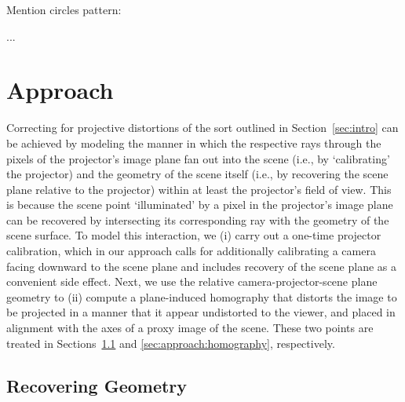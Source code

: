 \documentclass[review]{elsarticle}
\begin{document}
Mention circles pattern: \cite{chiu2011novel}

...


\section{Approach}

Correcting for projective distortions of the sort outlined in Section~\ref{sec:intro} can be achieved by modeling the manner in which the respective rays through the pixels of the projector's image plane fan out into the scene (i.e., by `calibrating' the projector) and the geometry of the scene itself (i.e., by recovering the scene plane relative to the projector) within at least the projector's field of view. This is because the scene point `illuminated' by a pixel in the projector's image plane can be recovered by intersecting its corresponding ray with the geometry of the scene surface. To model this interaction, we (i) carry out a one-time projector calibration, which in our approach calls for additionally calibrating a camera facing downward to the scene plane and includes recovery of the scene plane as a convenient side effect. Next, we use the relative camera-projector-scene plane geometry to (ii) compute a plane-induced homography that distorts the image to be projected in a manner that it appear undistorted to the viewer, and placed in alignment with the axes of a proxy image of the scene. These two points are treated in Sections~\ref{sec:approach:geometry} and \ref{sec:approach:homography}, respectively.

\subsection{Recovering Geometry}\label{sec:approach:geometry}
\end{document}
